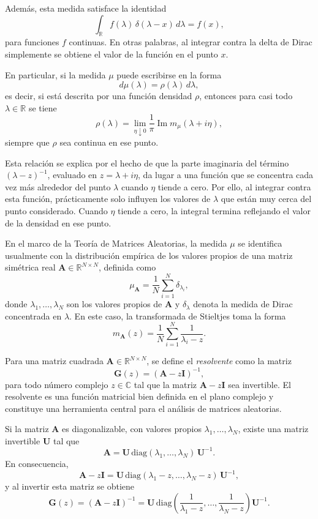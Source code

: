 \documentclass[letterpaper,12pt,oneside]{book}
\begin{document}
Además, esta medida satisface la identidad
\[\int_{\mathbb{R}} f(\lambda)\,\delta(\lambda-x)\,d\lambda
=
f(x),
\]
para funciones $f$ continuas. En otras palabras, al integrar contra la delta
de Dirac simplemente se obtiene el valor de la función en el punto $x$.

En particular, si la medida $\mu$ puede escribirse en la forma
\[
d\mu(\lambda)=\rho(\lambda)\,d\lambda,
\]
es decir, si está descrita por una función densidad $\rho$, entonces para casi todo
$\lambda \in \mathbb{R}$ se tiene
\[
\rho(\lambda)
=
\lim_{\eta\downarrow0}
\frac{1}{\pi}
\operatorname{Im} m_\mu(\lambda+i\eta),
\]
siempre que $\rho$ sea continua en ese punto.

Esta relación se explica por el hecho de que la parte imaginaria del término $(\lambda - z)^{-1}$, evaluado en $z=\lambda+i\eta$, da lugar a una función que se concentra cada vez más alrededor del punto $\lambda$ cuando $\eta$ tiende a cero.
Por ello, al integrar contra esta función, prácticamente solo influyen los valores de $\lambda$ que están muy cerca del punto considerado. Cuando $\eta$ tiende a cero, la integral termina reflejando el valor de la
densidad en ese punto.

En el marco de la Teoría de Matrices Aleatorias, la medida $\mu$ se identifica usualmente con la distribución empírica de los valores propios de una matriz simétrica real
$\mathbf{A} \in \mathbb{R}^{N \times N}$, definida como
\[
\mu_{\mathbf{A}} = \frac{1}{N} \sum_{i=1}^N \delta_{\lambda_i},
\]
donde $\lambda_1, \dots, \lambda_N$ son los valores propios de $\mathbf{A}$ y $\delta_{\lambda}$
denota la medida de Dirac concentrada en $\lambda$. En este caso, la  transformada de Stieltjes toma la forma
\[
m_{\mathbf{A}}(z) = \frac{1}{N} \sum_{i=1}^N \frac{1}{\lambda_i - z}.
\]

Para una matriz cuadrada $\mathbf{A} \in \mathbb{R}^{N \times N}$, se define el \emph{resolvente} como la matriz
\[
\mathbf{G}(z) = (\mathbf{A} - z\mathbf{I})^{-1},
\]
para todo número complejo $z \in \mathbb{C}$ tal que la matriz $\mathbf{A} - z\mathbf{I}$ sea
invertible. El resolvente es una función matricial bien definida en el plano complejo y constituye una herramienta central para el análisis de matrices aleatorias.

Si la matriz $\mathbf{A}$ es diagonalizable, con valores propios
$\lambda_1,\dots,\lambda_N$, existe una matriz invertible $\mathbf{U}$
tal que
\[
\mathbf{A}
=
\mathbf{U}\,\mathrm{diag}(\lambda_1,\dots,\lambda_N)\,\mathbf{U}^{-1}.
\]
En consecuencia,
\[
\mathbf{A}-z\mathbf{I}
=
\mathbf{U}\,\mathrm{diag}(\lambda_1-z,\dots,\lambda_N-z)\,\mathbf{U}^{-1},
\]
y al invertir esta matriz se obtiene
\[
\mathbf{G}(z)
=
(\mathbf{A}-z\mathbf{I})^{-1}
=
\mathbf{U}\,\mathrm{diag}\!\left(
\frac{1}{\lambda_1-z},\dots,
\frac{1}{\lambda_N-z}
\right)\mathbf{U}^{-1}.
\]
\end{document}
